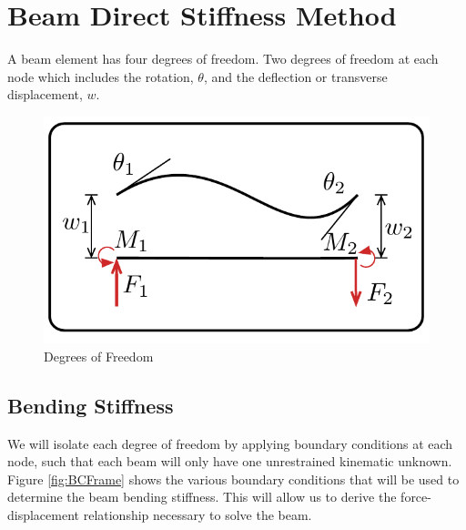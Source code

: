 \section{Beam Direct Stiffness Method}

A beam element has four degrees of freedom. Two degrees of freedom at each node which includes the rotation, $\theta$, and the deflection or transverse displacement, $w$.

\begin{figure}[h]	
	\centerline{
		\includegraphics[width=0.7\columnwidth]{Figures/DeflectionandRotation}
		}
	\caption{Degrees of Freedom}
	\label{fig:DeflectionandRotation}
\end{figure}

\subsection{Bending Stiffness}

We will isolate each degree of freedom by applying boundary conditions at each node, such that each beam will only have one unrestrained kinematic unknown. Figure \ref{fig:BCFrame} shows the various boundary conditions that will be used to determine the beam bending stiffness. This will allow us to derive the force-displacement relationship necessary to solve the beam.

